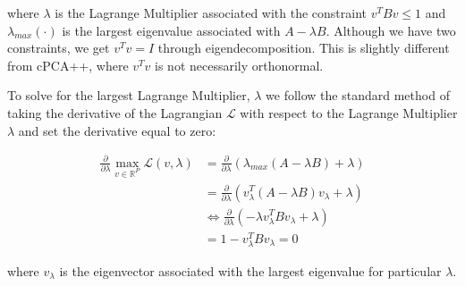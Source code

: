 \documentclass[12pt]{article}
\begin{document}
where $\lambda$ is the Lagrange Multiplier associated with the constraint $v^TBv \leq 1$ and $\lambda_{max}\left(\cdot\right)$ is the largest eigenvalue associated with $A - \lambda B$. Although we have two constraints, we get $v^T v = I$ through eigendecomposition. This is slightly different from cPCA++, where $v^{T}v$ is not necessarily orthonormal. 

To solve for the largest Lagrange Multiplier, $\lambda$ we follow the standard method of taking the derivative of the Lagrangian $\mathcal{L}$ with respect to the Lagrange Multiplier $\lambda$ and set the derivative equal to zero: 

\begin{align}
  \frac{\partial}{\partial\lambda} \max_{v\in \mathbb{R}^{P}}\mathcal{L}\left(v,\lambda\right) &= \frac{\partial}{\partial\lambda}\left(\lambda_{max}\left(A-\lambda B\right)  + \lambda\right) \nonumber \\ 
                                                                                               &= \frac{\partial}{\partial\lambda}\left(v_{\lambda}^{T}\left(A- \lambda B\right)v_{\lambda} +\lambda \right) \nonumber\\
                                                                                               &\Leftrightarrow \frac{\partial}{\partial\lambda}\left( -\lambda v_{\lambda}^{T} Bv_{\lambda} +\lambda \right) \nonumber\\
                                                                                               &= 1-v_{\lambda}^{T}B v_{\lambda} = 0 \label{eq:3}
\end{align}

where $v_\lambda$ is the eigenvector associated with the largest eigenvalue for particular $\lambda$. %

\end{document}
